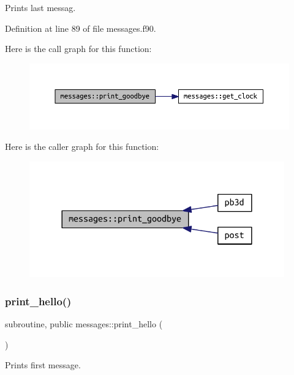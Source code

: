 Prints last messag. 



Definition at line 89 of file messages.\+f90.

Here is the call graph for this function\+:
\nopagebreak
\begin{figure}[H]
\begin{center}
\leavevmode
\includegraphics[width=350pt]{namespacemessages_a5d3f456913230bdf985c363e8cee8489_cgraph}
\end{center}
\end{figure}
Here is the caller graph for this function\+:
\nopagebreak
\begin{figure}[H]
\begin{center}
\leavevmode
\includegraphics[width=312pt]{namespacemessages_a5d3f456913230bdf985c363e8cee8489_icgraph}
\end{center}
\end{figure}
\mbox{\label{namespacemessages_a60c95b4c352b0087f32ef87279da49ca}} 
\subsubsection{\texorpdfstring{print\+\_\+hello()}{print\_hello()}}
{\footnotesize\ttfamily subroutine, public messages\+::print\+\_\+hello (\begin{DoxyParamCaption}{ }\end{DoxyParamCaption})}



Prints first message. 




